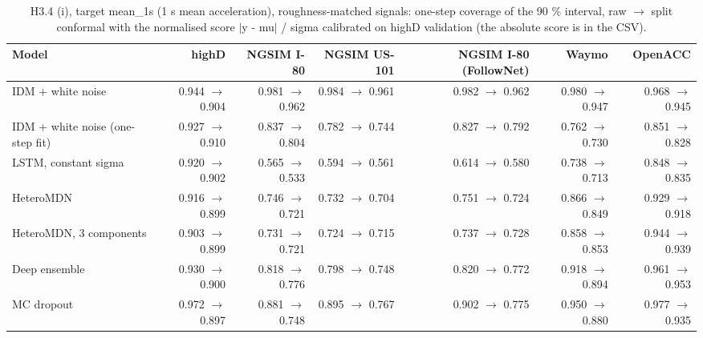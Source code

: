 \begin{table}[htbp]
\centering
\footnotesize
\caption{H3.4 (i), target mean\_1s (1 s mean acceleration), roughness-matched signals: one-step coverage of the 90 \% interval, raw $\rightarrow$ split conformal with the normalised score $|$y - mu$|$ / sigma calibrated on highD validation (the absolute score is in the CSV).}
\label{tab:t4-onestep-conformal--matched--mean-1s}
\begin{tabular}{lrrrrrr}
\toprule
Model & highD & NGSIM I-80 & NGSIM US-101 & NGSIM I-80 (FollowNet) & Waymo & OpenACC \\
\midrule
IDM + white noise & 0.944 $\rightarrow$ 0.904 & 0.981 $\rightarrow$ 0.962 & 0.984 $\rightarrow$ 0.961 & 0.982 $\rightarrow$ 0.962 & 0.980 $\rightarrow$ 0.947 & 0.968 $\rightarrow$ 0.945 \\
IDM + white noise (one-step fit) & 0.927 $\rightarrow$ 0.910 & 0.837 $\rightarrow$ 0.804 & 0.782 $\rightarrow$ 0.744 & 0.827 $\rightarrow$ 0.792 & 0.762 $\rightarrow$ 0.730 & 0.851 $\rightarrow$ 0.828 \\
LSTM, constant sigma & 0.920 $\rightarrow$ 0.902 & 0.565 $\rightarrow$ 0.533 & 0.594 $\rightarrow$ 0.561 & 0.614 $\rightarrow$ 0.580 & 0.738 $\rightarrow$ 0.713 & 0.848 $\rightarrow$ 0.835 \\
HeteroMDN & 0.916 $\rightarrow$ 0.899 & 0.746 $\rightarrow$ 0.721 & 0.732 $\rightarrow$ 0.704 & 0.751 $\rightarrow$ 0.724 & 0.866 $\rightarrow$ 0.849 & 0.929 $\rightarrow$ 0.918 \\
HeteroMDN, 3 components & 0.903 $\rightarrow$ 0.899 & 0.731 $\rightarrow$ 0.721 & 0.724 $\rightarrow$ 0.715 & 0.737 $\rightarrow$ 0.728 & 0.858 $\rightarrow$ 0.853 & 0.944 $\rightarrow$ 0.939 \\
Deep ensemble & 0.930 $\rightarrow$ 0.900 & 0.818 $\rightarrow$ 0.776 & 0.798 $\rightarrow$ 0.748 & 0.820 $\rightarrow$ 0.772 & 0.918 $\rightarrow$ 0.894 & 0.961 $\rightarrow$ 0.953 \\
MC dropout & 0.972 $\rightarrow$ 0.897 & 0.881 $\rightarrow$ 0.748 & 0.895 $\rightarrow$ 0.767 & 0.902 $\rightarrow$ 0.775 & 0.950 $\rightarrow$ 0.880 & 0.977 $\rightarrow$ 0.935 \\

\end{tabular}
\end{table}
